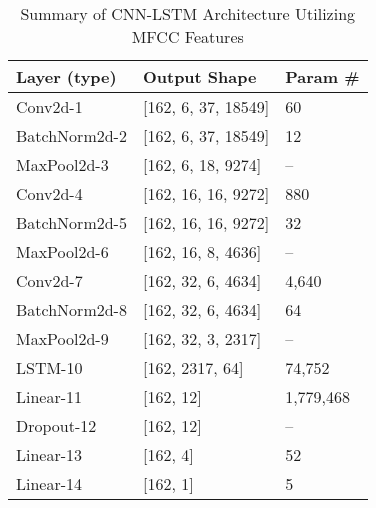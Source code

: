 
\begin{table}[!t]
    \centering
    \caption{Summary of CNN-LSTM Architecture Utilizing MFCC Features}
    \label{table:cnn_lstm}
    \begin{tabular}{lll}
        \toprule
        \textbf{Layer (type)} & \textbf{Output Shape} & \textbf{Param \#} \\
        \midrule
        Conv2d-1 & [162, 6, 37, 18549] & 60 \\
        BatchNorm2d-2 & [162, 6, 37, 18549] & 12 \\
        MaxPool2d-3 & [162, 6, 18, 9274] & -- \\
        \addlinespace
        Conv2d-4 & [162, 16, 16, 9272] & 880 \\
        BatchNorm2d-5 & [162, 16, 16, 9272] & 32 \\
        MaxPool2d-6 & [162, 16, 8, 4636] & -- \\
        \addlinespace
        Conv2d-7 & [162, 32, 6, 4634] & 4,640 \\
        BatchNorm2d-8 & [162, 32, 6, 4634] & 64 \\
        MaxPool2d-9 & [162, 32, 3, 2317] & -- \\
        \addlinespace
        LSTM-10 & [162, 2317, 64] & 74,752 \\
        Linear-11 & [162, 12] & 1,779,468 \\
        Dropout-12 & [162, 12] & -- \\
        Linear-13 & [162, 4] & 52 \\
        Linear-14 & [162, 1] & 5 \\
        \bottomrule
    \end{tabular}
\end{table}